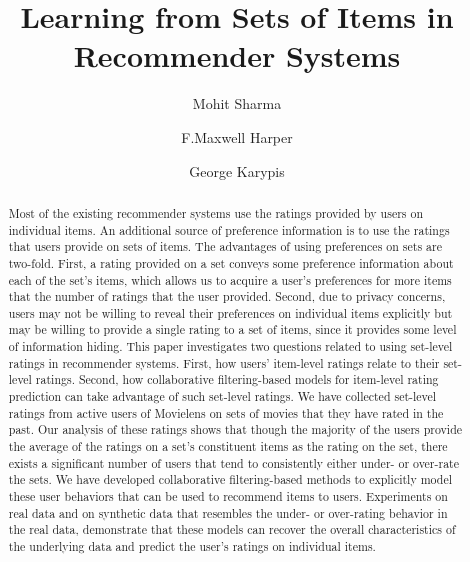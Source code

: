 \documentclass[format=acmsmall, review=false, screen=true]{acmart}
\newcommand*{\ML}{Movielens\xspace}
\begin{document}
\title{Learning from Sets of Items in Recommender Systems}

\author{Mohit Sharma}
\author{F.Maxwell Harper}
\author{George Karypis}


\begin{abstract}
Most of the existing recommender systems use the ratings provided by users on
individual items.
An additional source of preference information is to use the ratings that users provide on sets of items.
The advantages of using preferences on sets are two-fold. First, a
rating provided on a set conveys some preference information about each of the
set's items, which allows us to acquire a user's preferences for more items that
the number of ratings that the user provided.
Second, due to
privacy concerns, users may not be willing to reveal their preferences on
individual items explicitly but may be willing to provide a single rating to a
set of items, since it provides some level of information hiding. This paper
investigates two questions related to using set-level ratings in
recommender systems. First, how users' item-level ratings relate to their
set-level ratings. Second, how collaborative filtering-based models for
item-level rating prediction can take advantage of such set-level ratings. 
We have collected set-level ratings from active users of \ML
on sets of movies that they have rated in the past. 
Our analysis of these ratings shows that though the majority of the users
provide the average of the ratings on a set's constituent items as the rating on
the set, there exists a significant number of users that tend to
consistently either under- or over-rate the sets.
We have developed collaborative filtering-based
methods to explicitly model these user behaviors that can be used to recommend
items to users. 
Experiments on real data and on synthetic data that resembles the under- or
over-rating behavior in the real data, demonstrate that these models can recover the
overall characteristics of the underlying data and predict the user's ratings on
individual items.
\end{abstract}
\end{document}
